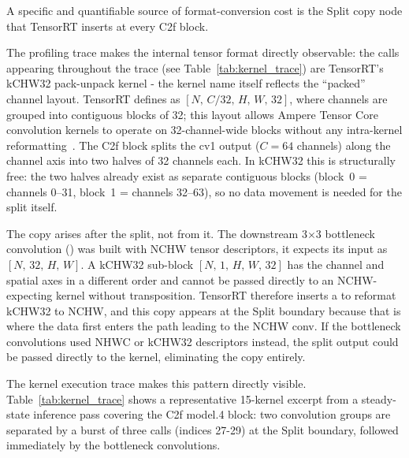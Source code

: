 \documentclass[12pt,a4paper]{report}
\begin{document}
A specific and quantifiable source of format-conversion cost is the Split copy node that
TensorRT inserts at every C2f block.

The profiling trace makes the internal tensor format directly observable:
the  calls appearing throughout the trace (see Table~\ref{tab:kernel_trace})
are TensorRT's kCHW32 pack-unpack kernel - the kernel name itself reflects the
``packed'' channel layout.
TensorRT defines  as $[N,\,C/32,\,H,\,W,\,32]$, where channels
are grouped into contiguous blocks of 32; this layout allows Ampere Tensor Core convolution
kernels to operate on 32-channel-wide blocks without any intra-kernel
reformatting~\cite{nvidia_trt_data_formats}.
The C2f block splits the cv1 output ($C{=}64$ channels) along the channel axis into two halves of 32
channels each.
In kCHW32 this is structurally free: the two halves already exist as separate contiguous blocks
(block~0 = channels 0--31, block~1 = channels 32--63), so no data movement is needed for the split
itself.

The copy arises after the split, not from it.
The downstream 3$\times$3 bottleneck convolution () was built with NCHW tensor
descriptors, it expects its input as $[N,\,32,\,H,\,W]$.
A kCHW32 sub-block $[N,\,1,\,H,\,W,\,32]$ has the channel and spatial axes in a different order
and cannot be passed directly to an NCHW-expecting kernel without transposition.
TensorRT therefore inserts a  to reformat kCHW32 to NCHW, and this copy
appears at the Split boundary because that is where the data first enters the path leading to the
NCHW conv.
If the bottleneck convolutions used NHWC or kCHW32 descriptors instead, the split output could
be passed directly to the kernel, eliminating the copy entirely.

The kernel execution trace makes this pattern directly visible.
Table~\ref{tab:kernel_trace} shows a representative 15-kernel excerpt from a steady-state inference
pass covering the C2f model.4 block: two convolution groups are separated by a burst of three
 calls (indices 27-29) at the Split boundary, followed immediately by the
bottleneck convolutions.
\end{document}
